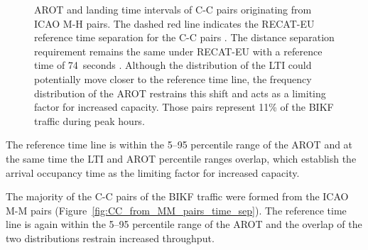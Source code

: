\begin{figure}[h]
    \caption[AROT and LTI of C-C pairs originating from ICAO M-H pairs]{AROT and landing time intervals of C-C pairs originating from ICAO M-H pairs. The dashed red line indicates the RECAT-EU reference time separation for the C-C pairs \protect{}. The distance separation requirement remains the same under RECAT-EU with a reference time of 74~seconds \protect{}. Although the distribution of the LTI could potentially move closer to the reference time line, the frequency distribution of the AROT restrains this shift and acts as a limiting factor for increased capacity. Those pairs represent 11\% of the BIKF traffic during peak hours.}
    \label{fig:CC_from_MH_pairs_time_sep}
\end{figure}

The reference time line is within the 5--95 percentile range of the AROT and at the same time the LTI and AROT percentile ranges overlap, which establish the arrival occupancy time as the limiting factor for increased capacity.


The majority of the C-C pairs of the BIKF traffic were formed from the ICAO M-M pairs (Figure~\ref{fig:CC_from_MM_pairs_time_sep}). The reference time line is again within the 5--95 percentile range of the AROT and the overlap of the two distributions restrain increased throughput.

